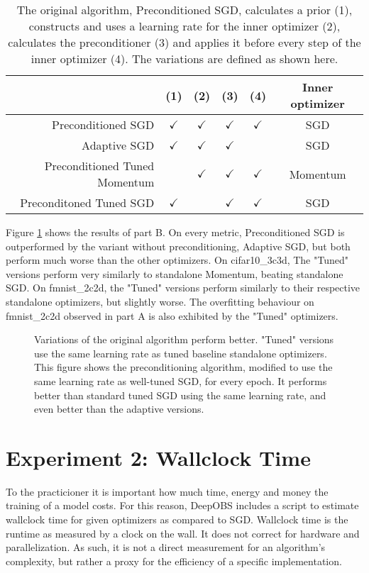 \documentclass[twoside,12pt,a4paper]{report}
\begin{document}
\begin{table}[h]
	\centering
	\begin{tabular}{|r||c|c|c|c|c|}
		\hline 
		& (1) & (2) & (3) & (4) & Inner optimizer\\ 
		\hline 
		Preconditioned SGD & $\checkmark$ & $\checkmark$& $\checkmark$ & $\checkmark$ & SGD \\ 
		\hline 
		Adaptive SGD & $\checkmark$ & $\checkmark$ & $\checkmark$ & & SGD \\ 
		\hline 
		Preconditioned Tuned Momentum &  & $\checkmark$ & $\checkmark$ & $\checkmark$ & Momentum \\ 
		\hline 
		Preconditoned Tuned SGD & $\checkmark$ &  & $\checkmark$ & $\checkmark$ & SGD \\ 
		\hline 
	\end{tabular}
	\caption{The original algorithm, Preconditioned SGD, calculates a prior (1), constructs and uses a learning rate for the inner optimizer (2), calculates the preconditioner (3) and applies it before every step of the inner optimizer (4). The variations are defined as shown here.}
	\label{tab:exp_tunedalpha}
\end{table}

Figure \ref{fig:exp_tunedalpha} shows the results of part B. 
On every metric, Preconditioned SGD is outperformed by the variant without preconditioning, Adaptive SGD, but both perform much worse than the other optimizers.
On cifar10\_3c3d, The "Tuned" versions perform very similarly to standalone Momentum, beating standalone SGD. On fmnist\_2c2d, the "Tuned" versions perform similarly to their respective standalone optimizers, but slightly worse.
The overfitting behaviour on fmnist\_2c2d observed in part A is also exhibited by the "Tuned" optimizers.
\begin{figure}
		
		\caption{Variations of the original algorithm perform better. "Tuned" versions use the same learning rate as tuned baseline standalone optimizers.
			This figure shows the preconditioning algorithm, modified to use the same learning rate as well-tuned SGD, for every epoch. It performs better than standard tuned SGD using the same learning rate, and even better than the adaptive versions.}
		\label{fig:exp_tunedalpha}
\end{figure}

\section{Experiment 2: Wallclock Time}
To the practicioner it is important how much time, energy and money the training of a model costs. For this reason, DeepOBS includes a script to estimate wallclock time for given optimizers as compared to SGD. Wallclock time is the runtime as measured by a clock on the wall. It does not correct for hardware and parallelization. As such, it is not a direct measurement for an algorithm's complexity, but rather a proxy for the efficiency of a specific implementation.
\end{document}
